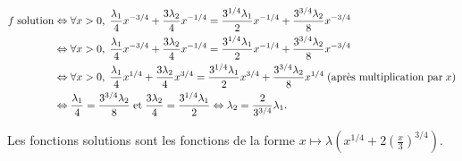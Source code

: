 {{\begin{align*}\ensuremath
f\;\text{solution}&\Leftrightarrow\forall x>0,\; \frac{\lambda_1}{4}x^{-3/4}+ \frac{3\lambda_2}{4}x^{-1/4}= \frac{3^{1/4}\lambda_1}{2}x^{-1/4}+ \frac{3^{3/4}\lambda_2}{8}x^{-3/4}\\
 &\Leftrightarrow\forall x>0,\; \frac{\lambda_1}{4}x^{-3/4}+ \frac{3\lambda_2}{4}x^{-1/4}= \frac{3^{1/4}\lambda_1}{2}x^{-1/4}+ \frac{3^{3/4}\lambda_2}{8}x^{-3/4}\\
 &\Leftrightarrow\forall x>0,\; \frac{\lambda_1}{4}x^{1/4}+ \frac{3\lambda_2}{4}x^{3/4}= \frac{3^{1/4}\lambda_1}{2}x^{3/4}+ \frac{3^{3/4}\lambda_2}{8}x^{1/4}\;(\text{après multiplication par}\;x)\\
 &\Leftrightarrow \frac{\lambda_1}{4}= \frac{3^{3/4}\lambda_2}{8}\;\text{et}\; \frac{3\lambda_2}{4}= \frac{3^{1/4}\lambda_1}{2}\Leftrightarrow\lambda_2= \frac{2}{3^{3/4}}\lambda_1.
\end{align*}

Les fonctions solutions sont les fonctions de la forme $x\mapsto\lambda\left(x^{1/4}+2\left( \frac{x}{3}\right)^{3/4}\right)$.}
}